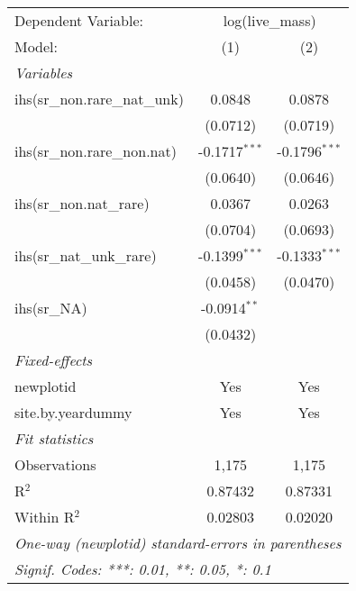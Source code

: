 \begin{tabular}{lcc}
\tabularnewline\midrule\midrule
Dependent Variable:&\multicolumn{2}{c}{log(live\_mass)}\\
Model:&(1) & (2)\\
\midrule \emph{Variables}&   &  \\
ihs(sr\_non.rare\_nat\_unk)&0.0848 & 0.0878\\
  &(0.0712) & (0.0719)\\
ihs(sr\_non.rare\_non.nat)&-0.1717$^{***}$ & -0.1796$^{***}$\\
  &(0.0640) & (0.0646)\\
ihs(sr\_non.nat\_rare)&0.0367 & 0.0263\\
  &(0.0704) & (0.0693)\\
ihs(sr\_nat\_unk\_rare)&-0.1399$^{***}$ & -0.1333$^{***}$\\
  &(0.0458) & (0.0470)\\
ihs(sr\_NA)&-0.0914$^{**}$ &   \\
  &(0.0432) &   \\
\midrule \emph{Fixed-effects}&   &  \\
newplotid & Yes & Yes\\
site.by.yeardummy & Yes & Yes\\
\midrule \emph{Fit statistics}&  & \\
Observations & 1,175&1,175\\
R$^2$ & 0.87432&0.87331\\
Within R$^2$ & 0.02803&0.02020\\
\midrule\midrule\multicolumn{3}{l}{\emph{One-way (newplotid) standard-errors in parentheses}}\\
\multicolumn{3}{l}{\emph{Signif. Codes: ***: 0.01, **: 0.05, *: 0.1}}\\
\end{tabular}


